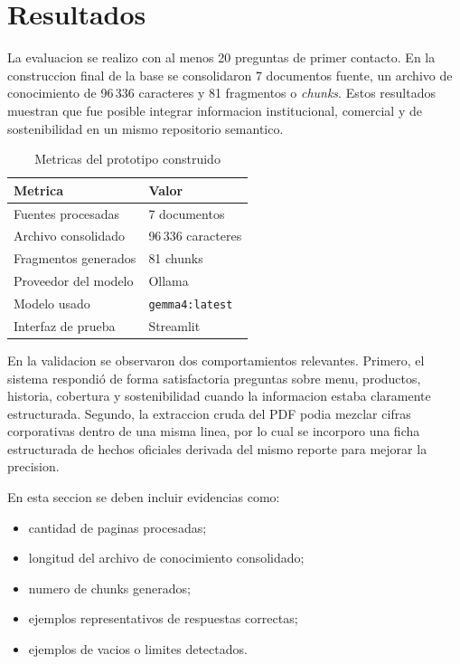 \documentclass[journal]{IEEEtran}
\begin{document}
\section{Resultados}
La evaluacion se realizo con al menos 20 preguntas de primer contacto. En la construccion final de la base se consolidaron 7 documentos fuente, un archivo de conocimiento de 96\,336 caracteres y 81 fragmentos o \textit{chunks}. Estos resultados muestran que fue posible integrar informacion institucional, comercial y de sostenibilidad en un mismo repositorio semantico.

\begin{table}[htbp]
\caption{Metricas del prototipo construido}
\centering
\begin{tabular}{p{3.2cm} p{3.7cm}}
\toprule
\textbf{Metrica} & \textbf{Valor} \\
\midrule
Fuentes procesadas & 7 documentos \\
Archivo consolidado & 96\,336 caracteres \\
Fragmentos generados & 81 chunks \\
Proveedor del modelo & Ollama \\
Modelo usado & \texttt{gemma4:latest} \\
Interfaz de prueba & Streamlit \\
\bottomrule
\end{tabular}
\label{tab:metricas}
\end{table}

En la validacion se observaron dos comportamientos relevantes. Primero, el sistema respondió de forma satisfactoria preguntas sobre menu, productos, historia, cobertura y sostenibilidad cuando la informacion estaba claramente estructurada. Segundo, la extraccion cruda del PDF podia mezclar cifras corporativas dentro de una misma linea, por lo cual se incorporo una ficha estructurada de hechos oficiales derivada del mismo reporte para mejorar la precision.

En esta seccion se deben incluir evidencias como:

\begin{itemize}
\item cantidad de paginas procesadas;
\item longitud del archivo de conocimiento consolidado;
\item numero de chunks generados;
\item ejemplos representativos de respuestas correctas;
\item ejemplos de vacios o limites detectados.
\end{itemize}
\end{document}
